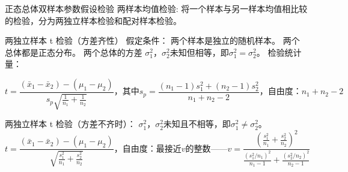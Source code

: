 \documentclass[presentation]{beamer}
\begin{document}
\begin{frame}[label={sec:org9a52cb3}]{正态总体双样本参数假设检验}
\alert{两样本均值检验:}
将一个样本与另一样本均值相比较的检验，分为两独立样本检验和配对样本检验。
\begin{block}{两独立样本 t 检验（方差齐性）}
假定条件：
 两个样本是独立的随机样本。
 两个总体都是正态分布。  
 两个总体的方差 \(\sigma_1^2，\sigma_2^2未知但相等，即\sigma_1^2=\sigma_2^2。\)  
检验统计量：

$$t=\frac{(\bar x_1-\bar x_2)-(\mu_1-\mu_2)}{s_p\sqrt{\frac{1}{n_1}+\frac{1}{n_2}}}，其中s_p=\frac{(n_1-1)s_1^2+(n_2-1)s_2^2}{n_1+n_2-2}，自由度：n_1+n_2-2$$
\end{block}
\begin{block}{两独立样本 t 检验（方差不齐时）：}
\(\sigma_1^2，\sigma_2^2未知且不相等，即\sigma_1^2\ne\sigma_2^2。\)
$$t=\frac{(\bar x_1-\bar x_2)-(\mu_1-\mu_2)}{\sqrt{\frac{s_1^2}{n_1}+\frac{s_2^2}{n_2}}}，自由度：最接近v的整数——v=\frac{(\frac{s_1^2}{n_1}+\frac{s_2^2}{n_2})^2}{\frac{(s_1^2/n_1)^2}{n_1-1}+\frac{(s_2^2/n_2)^2}{n_2-1}}$$
\end{block}
\end{frame}
\end{document}
